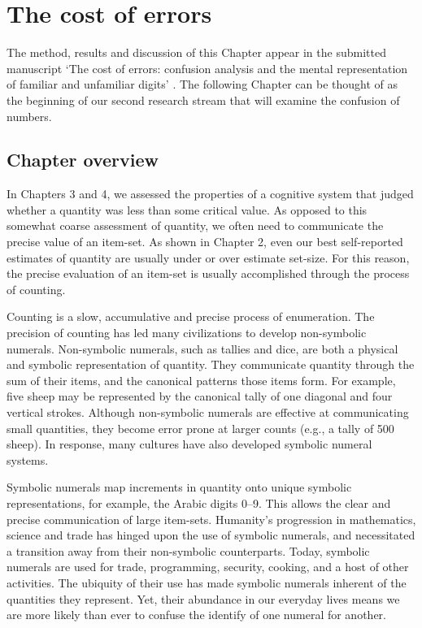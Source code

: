 \chapter{The cost of errors} 

\label{Chapter 6}

\vspace{3cm}
\newpage


\noindent
The method, results and discussion of this Chapter appear in the submitted manuscript `The cost of errors: confusion analysis and the mental representation of familiar and unfamiliar digits' \cite{garrettWheel1}. The following Chapter can be thought of as the beginning of our second research stream that will examine the confusion of numbers.

\color{\Red}
\section{Chapter overview}
In Chapters 3 and 4, we assessed the properties of a cognitive system that judged whether a quantity was less than some critical value. As opposed to this somewhat coarse assessment of quantity, we often need to communicate the precise value of an item-set. As shown in Chapter 2, even our best self-reported estimates of quantity are usually under or over estimate set-size. For this reason, the precise evaluation of an item-set is usually accomplished through the process of counting.

Counting is a slow, accumulative and precise process of enumeration. The precision of counting has led many civilizations to develop non-symbolic numerals. Non-symbolic numerals, such as tallies and dice, are both a physical and symbolic representation of quantity. They communicate quantity through the sum of their items, and the canonical patterns those items form. For example, five sheep may be represented by the canonical tally of one diagonal and four vertical strokes. Although non-symbolic numerals are effective at communicating small quantities, they become error prone at larger counts (e.g., a tally of 500 sheep). In response, many cultures have also developed symbolic numeral systems.

Symbolic numerals map increments in quantity onto unique symbolic representations, for example, the Arabic digits 0--9. This allows the clear and precise communication of large item-sets. Humanity's progression in mathematics, science and trade has hinged upon the use of symbolic numerals, and necessitated a transition away from their non-symbolic counterparts. Today, symbolic numerals are used for trade, programming, security, cooking, and a host of other activities. The ubiquity of their use has made symbolic numerals inherent of the quantities they represent. Yet, their abundance in our everyday lives means we are more likely than ever to confuse the identify of one numeral for another. 

